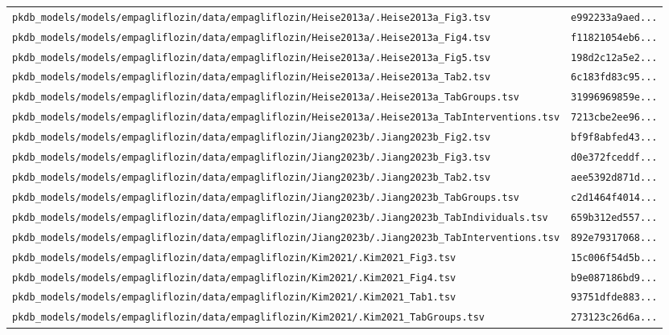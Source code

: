 \begin{longtable}{ll}
\texttt{pkdb\_models/models/empagliflozin/data/empagliflozin/Heise2013a/.Heise2013a\_Fig3.tsv} & \texttt{e992233a9aed...} \\
\texttt{pkdb\_models/models/empagliflozin/data/empagliflozin/Heise2013a/.Heise2013a\_Fig4.tsv} & \texttt{f11821054eb6...} \\
\texttt{pkdb\_models/models/empagliflozin/data/empagliflozin/Heise2013a/.Heise2013a\_Fig5.tsv} & \texttt{198d2c12a5e2...} \\
\texttt{pkdb\_models/models/empagliflozin/data/empagliflozin/Heise2013a/.Heise2013a\_Tab2.tsv} & \texttt{6c183fd83c95...} \\
\texttt{pkdb\_models/models/empagliflozin/data/empagliflozin/Heise2013a/.Heise2013a\_TabGroups.tsv} & \texttt{31996969859e...} \\
\texttt{pkdb\_models/models/empagliflozin/data/empagliflozin/Heise2013a/.Heise2013a\_TabInterventions.tsv} & \texttt{7213cbe2ee96...} \\
\texttt{pkdb\_models/models/empagliflozin/data/empagliflozin/Jiang2023b/.Jiang2023b\_Fig2.tsv} & \texttt{bf9f8abfed43...} \\
\texttt{pkdb\_models/models/empagliflozin/data/empagliflozin/Jiang2023b/.Jiang2023b\_Fig3.tsv} & \texttt{d0e372fceddf...} \\
\texttt{pkdb\_models/models/empagliflozin/data/empagliflozin/Jiang2023b/.Jiang2023b\_Tab2.tsv} & \texttt{aee5392d871d...} \\
\texttt{pkdb\_models/models/empagliflozin/data/empagliflozin/Jiang2023b/.Jiang2023b\_TabGroups.tsv} & \texttt{c2d1464f4014...} \\
\texttt{pkdb\_models/models/empagliflozin/data/empagliflozin/Jiang2023b/.Jiang2023b\_TabIndividuals.tsv} & \texttt{659b312ed557...} \\
\texttt{pkdb\_models/models/empagliflozin/data/empagliflozin/Jiang2023b/.Jiang2023b\_TabInterventions.tsv} & \texttt{892e79317068...} \\
\texttt{pkdb\_models/models/empagliflozin/data/empagliflozin/Kim2021/.Kim2021\_Fig3.tsv} & \texttt{15c006f54d5b...} \\
\texttt{pkdb\_models/models/empagliflozin/data/empagliflozin/Kim2021/.Kim2021\_Fig4.tsv} & \texttt{b9e087186bd9...} \\
\texttt{pkdb\_models/models/empagliflozin/data/empagliflozin/Kim2021/.Kim2021\_Tab1.tsv} & \texttt{93751dfde883...} \\
\texttt{pkdb\_models/models/empagliflozin/data/empagliflozin/Kim2021/.Kim2021\_TabGroups.tsv} & \texttt{273123c26d6a...} \\

\end{longtable}
